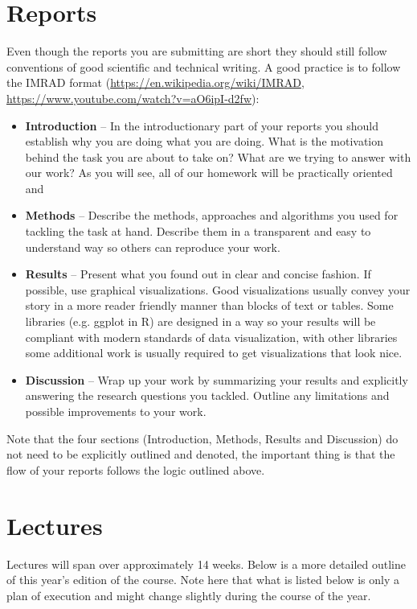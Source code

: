 \documentclass[fleqn,moreauthors,10pt]{ds_report}
\begin{document}
\section*{Reports}

Even though the reports you are submitting are short they should still follow conventions of good scientific and technical writing. A good practice is to follow the IMRAD format (\url{https://en.wikipedia.org/wiki/IMRAD}, \url{https://www.youtube.com/watch?v=aO6ipI-d2fw}):

\begin{itemize}
	\item \textbf{Introduction} -- In the introductionary part of your reports you should establish why you are doing what you are doing. What is the motivation behind the task you are about to take on? What are we trying to answer with our work? As you will see, all of our homework will be practically oriented and
	\item \textbf{Methods} -- Describe the methods, approaches and algorithms you used for tackling the task at hand. Describe them in a transparent and easy to understand way so others can reproduce your work.
	\item \textbf{Results} -- Present what you found out in clear and concise fashion. If possible, use graphical visualizations. Good visualizations usually convey your story in a more reader friendly manner than blocks of text or tables. Some libraries (e.g. ggplot in R) are designed in a way so your results will be compliant with modern standards of data visualization, with other libraries some additional work is usually required to get visualizations that look nice.
	\item \textbf{Discussion} -- Wrap up your work by summarizing your results and explicitly answering the research questions you tackled. Outline any limitations and possible improvements to your work.
\end{itemize}

Note that the four sections (Introduction, Methods, Results and Discussion) do not need to be explicitly outlined and denoted, the important thing is that the flow of your reports follows the logic outlined above.

\section*{Lectures}

Lectures will span over approximately 14 weeks. Below is a more detailed outline of this year's edition of the course. Note here that what is listed below is only a plan of execution and might change slightly during the course of the year.
\end{document}
